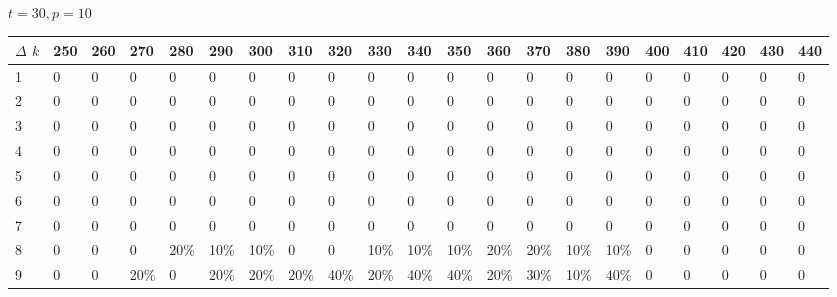 \documentclass[11pt]{article}
\begin{document}
\paragraph{}
$t =  30, p =  10$
\begin{center} \tiny \begin{tabular}{|l |l |l |l |l |l |l |l |l |l |l |l |l |l |l |l |l |l |l |l |l |} \hline
$\Delta$ $k$ &250 & 260 & 270 & 280 & 290 & 300 & 310 & 320 & 330 & 340 & 350 & 360 & 370 & 380 & 390 & 400 & 410 & 420 & 430 & 440  \\ \hline
1 & 0 & 0 & 0 & 0 & 0 & 0 & 0 & 0 & 0 & 0 & 0 & 0 & 0 & 0 & 0 & 0 & 0 & 0 & 0 & 0  \\ \hline
2 & 0 & 0 & 0 & 0 & 0 & 0 & 0 & 0 & 0 & 0 & 0 & 0 & 0 & 0 & 0 & 0 & 0 & 0 & 0 & 0  \\ \hline
3 & 0 & 0 & 0 & 0 & 0 & 0 & 0 & 0 & 0 & 0 & 0 & 0 & 0 & 0 & 0 & 0 & 0 & 0 & 0 & 0  \\ \hline
4 & 0 & 0 & 0 & 0 & 0 & 0 & 0 & 0 & 0 & 0 & 0 & 0 & 0 & 0 & 0 & 0 & 0 & 0 & 0 & 0  \\ \hline
5 & 0 & 0 & 0 & 0 & 0 & 0 & 0 & 0 & 0 & 0 & 0 & 0 & 0 & 0 & 0 & 0 & 0 & 0 & 0 & 0  \\ \hline
6 & 0 & 0 & 0 & 0 & 0 & 0 & 0 & 0 & 0 & 0 & 0 & 0 & 0 & 0 & 0 & 0 & 0 & 0 & 0 & 0  \\ \hline
7 & 0 & 0 & 0 & 0 & 0 & 0 & 0 & 0 & 0 & 0 & 0 & 0 & 0 & 0 & 0 & 0 & 0 & 0 & 0 & 0  \\ \hline
8 & 0 & 0 & 0 & 20\% & 10\% & 10\% & 0 & 0 & 10\% & 10\% & 10\% & 20\% & 20\% & 10\% & 10\% & 0 & 0 & 0 & 0 & 0  \\ \hline
9 & 0 & 0 & 20\% & 0 & 20\% & 20\% & 20\% & 40\% & 20\% & 40\% & 40\% & 20\% & 30\% & 10\% & 40\% & 0 & 0 & 0 & 0 & 0  \\ \hline
\end{tabular}\end{center}
\end{document}
